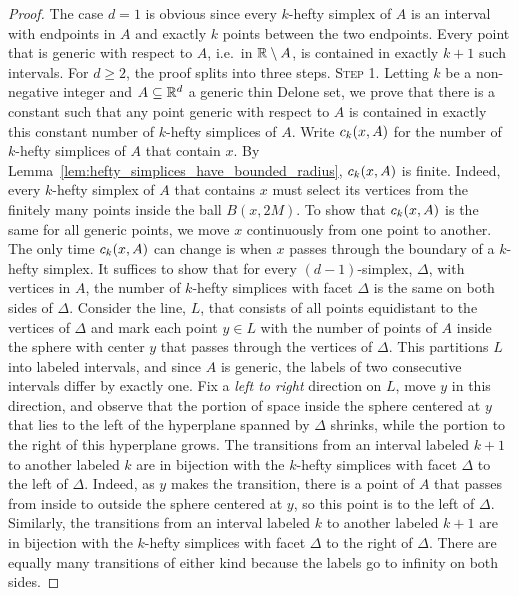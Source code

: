 \documentclass[10pt,a4paper]{article}
\newcommand {\mm}[1] {\ifmmode{#1}\else{\mbox{\(#1\)}}\fi}
\theoremstyle{plain}
\newcommand{\Rspace}        {\mm{{\mathbb R}}}
\newcommand{\cover}[2]      {\mm{{c}_{#1}{({#2})}}}
\begin{document}
\begin{proof}
  The case $d=1$ is obvious since every $k$-hefty simplex of $A$ is an interval with endpoints in $A$ and exactly $k$ points between the two endpoints.
  Every point that is generic with respect to $A$, i.e.\ in $\Rspace \setminus A$, is contained in exactly $k+1$ such intervals.
  For $d \geq 2$, the proof splits into three steps.
  \medskip \noindent
  \textsc{Step 1.} Letting $k$ be a non-negative integer and $A \subseteq \Rspace^d$ a generic thin Delone set, we prove that there is a constant such that any point generic with respect to $A$ is contained in exactly this constant number of $k$-hefty simplices of $A$.
  Write $\cover{k}{x,A}$ for the number of $k$-hefty simplices of $A$ that contain $x$. 
  By Lemma~\ref{lem:hefty_simplices_have_bounded_radius}, $\cover{k}{x,A}$ is finite.
  Indeed, every $k$-hefty simplex of $A$ that contains $x$ must select its vertices from the finitely many points inside the ball $B(x,2M)$.
  To show that $\cover{k}{x,A}$ is the same for all generic points, we move $x$ continuously from one point to another.
  The only time $\cover{k}{x,A}$ can change is when $x$ passes through the boundary of a $k$-hefty simplex. 
  It suffices to show that for every $(d-1)$-simplex, $\Delta$, with vertices in $A$, the number of $k$-hefty simplices with facet $\Delta$ is the same on both sides of $\Delta$. 
  \smallskip
  Consider the line, $L$, that consists of all points equidistant to the vertices of $\Delta$ and mark each point $y \in L$ with the number of points of $A$ inside the sphere with center $y$ that passes through the vertices of $\Delta$.
  This partitions $L$ into labeled intervals, and since $A$ is generic, the labels of two consecutive intervals differ by exactly one.
  Fix a \emph{left to right} direction on $L$, move $y$ in this direction, and observe that the portion of space inside the sphere centered at $y$ that lies to the left of the hyperplane spanned by $\Delta$ shrinks, while the portion to the right of this hyperplane grows.
  The transitions from an interval labeled $k+1$ to another labeled $k$ are in bijection with the $k$-hefty simplices with facet $\Delta$ to the left of $\Delta$.
  Indeed, as $y$ makes the transition, there is a point of $A$ that passes from inside to outside the sphere centered at $y$, so this point is to the left of $\Delta$.
  Similarly, the transitions from an interval labeled $k$ to another labeled $k+1$ are in bijection with the $k$-hefty simplices with facet $\Delta$ to the right of $\Delta$.
  There are equally many transitions of either kind because the labels go to infinity on both sides.

\end{proof}
\end{document}
